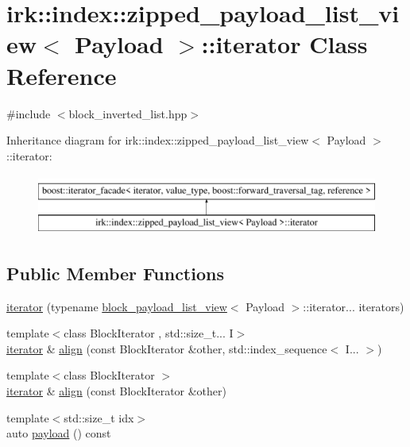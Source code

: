 \hypertarget{classirk_1_1index_1_1zipped__payload__list__view_1_1iterator}{}\section{irk\+:\+:index\+:\+:zipped\+\_\+payload\+\_\+list\+\_\+view$<$ Payload $>$\+:\+:iterator Class Reference}
\label{classirk_1_1index_1_1zipped__payload__list__view_1_1iterator}


{\ttfamily \#include $<$block\+\_\+inverted\+\_\+list.\+hpp$>$}

Inheritance diagram for irk\+:\+:index\+:\+:zipped\+\_\+payload\+\_\+list\+\_\+view$<$ Payload $>$\+:\+:iterator\+:\begin{figure}[H]
\begin{center}
\leavevmode
\includegraphics[height=2.000000cm]{classirk_1_1index_1_1zipped__payload__list__view_1_1iterator}
\end{center}
\end{figure}
\subsection*{Public Member Functions}
\begin{DoxyCompactItemize}
\item 
\mbox{\hyperlink{classirk_1_1index_1_1zipped__payload__list__view_1_1iterator_a469993754f092a3996e4de3c61411faf}{iterator}} (typename \mbox{\hyperlink{classirk_1_1index_1_1block__payload__list__view}{block\+\_\+payload\+\_\+list\+\_\+view}}$<$ Payload $>$\+::iterator... iterators)
\item 
{\footnotesize template$<$class Block\+Iterator , std\+::size\+\_\+t... I$>$ }\\\mbox{\hyperlink{classirk_1_1index_1_1zipped__payload__list__view_1_1iterator}{iterator}} \& \mbox{\hyperlink{classirk_1_1index_1_1zipped__payload__list__view_1_1iterator_a66e4e30f467ffca4b6b4328d55bf7f60}{align}} (const Block\+Iterator \&other, std\+::index\+\_\+sequence$<$ I... $>$)
\item 
{\footnotesize template$<$class Block\+Iterator $>$ }\\\mbox{\hyperlink{classirk_1_1index_1_1zipped__payload__list__view_1_1iterator}{iterator}} \& \mbox{\hyperlink{classirk_1_1index_1_1zipped__payload__list__view_1_1iterator_a5b941810905eb53ba4d1a0ee5a7b501a}{align}} (const Block\+Iterator \&other)
\item 
{\footnotesize template$<$std\+::size\+\_\+t idx$>$ }\\auto \mbox{\hyperlink{classirk_1_1index_1_1zipped__payload__list__view_1_1iterator_afb5b7b389b5952ff0bdb5eb6e90ea3cd}{payload}} () const
\end{DoxyCompactItemize}
